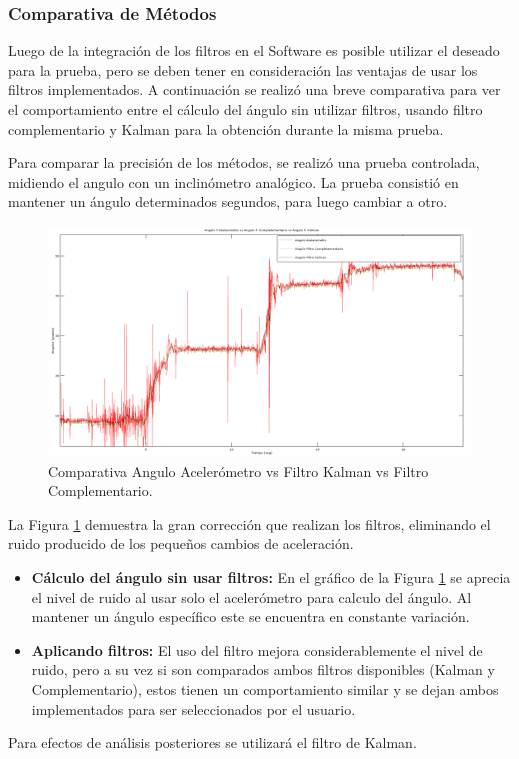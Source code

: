 \documentclass[12pt,a4paper]{article}
\begin{document}
\subsubsection{Comparativa de Métodos}
Luego de la integración de los filtros en el Software es posible utilizar el deseado para la prueba, pero se deben tener en consideración las ventajas de usar los filtros implementados. A continuación se realizó una breve comparativa para ver el comportamiento entre el cálculo del ángulo sin utilizar filtros, usando filtro complementario y Kalman para la obtención durante la misma prueba.

\newpage 
Para comparar la precisión de los métodos, se realizó una prueba controlada, midiendo el angulo con un inclinómetro analógico. La prueba consistió en mantener un ángulo determinados segundos, para luego cambiar a otro.
\begin{figure}[H]
	\centering
	\includegraphics[scale=0.4]{images/angKalCom}
	\caption{Comparativa Angulo Acelerómetro vs Filtro Kalman vs Filtro Complementario.}
	\label{fig:AnguloXvsFiltros}
\end{figure}

La Figura \ref{fig:AnguloXvsFiltros} demuestra la gran corrección que realizan los filtros, eliminando el ruido producido de los pequeños cambios de aceleración.
\begin{itemize}
	\item \textbf{Cálculo del ángulo sin usar filtros:} En el gráfico de la Figura \ref{fig:AnguloXvsFiltros} se aprecia el nivel de ruido al usar solo el acelerómetro para calculo del ángulo. Al mantener un ángulo específico este se encuentra en constante variación.
	\item \textbf{Aplicando filtros:} El uso del filtro mejora considerablemente el nivel de ruido, pero a su vez si son comparados ambos filtros disponibles (Kalman y Complementario), estos tienen un comportamiento similar y se dejan ambos implementados para ser seleccionados por el usuario.
\end{itemize}
Para efectos de análisis posteriores se utilizará el filtro de Kalman.
\end{document}
